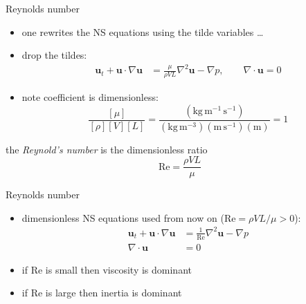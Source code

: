 \documentclass[10pt,hyperref,colorlinks]{beamer}
\newcommand{\bu}{\mathbf{u}}
\newcommand{\grad}{\nabla}
\newcommand{\Div}{\nabla\cdot}
\renewcommand{\Re}{\text{Re}}
\begin{document}
\begin{frame}{Reynolds number}

\begin{itemize}
\item one rewrites the NS equations using the tilde variables \dots
\item drop the tildes:
\begin{align*}
\bu_t + \bu \cdot \grad \bu &= \frac{\mu}{\rho V L} \grad^2 \bu - \grad p, \qquad 
\Div \bu = 0
\end{align*}
\item note coefficient is dimensionless:
	$$\frac{[\mu]}{[\rho] [V] [L]} = \frac{(\text{kg}\,\text{m}^{-1}\,\text{s}^{-1})}{(\text{kg}\,\text{m}^{-3}) (\text{m}\,\text{s}^{-1}) (\text{m})} = 1$$
\end{itemize}
\begin{definition} the \emph{Reynold's number} is the dimensionless ratio
	$$\Re = \frac{\rho V L}{\mu}$$
\end{definition}
\end{frame}


\begin{frame}{Reynolds number}

\begin{itemize}
\item dimensionless NS equations used from now on ($\Re = \rho V L/\mu > 0$):
\begin{align*}
\bu_t + \bu \cdot \grad \bu &= \frac{1}{\Re} \grad^2 \bu - \grad p \\
\Div \bu &= 0
\end{align*}
\item if $\Re$ is small then viscosity is dominant
\item if $\Re$ is large then inertia is dominant
\end{itemize}
\end{frame}
\end{document}
